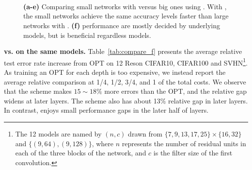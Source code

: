 \begin{figure*}[ht!]
    \centering
    
    ~
    
    ~
    
    ~
    
    \caption{\textbf{(a-e)} Comparing small networks with \adaloss versus big ones using \const. With \adaloss, 
    the small networks achieve the same accuracy levels faster than large networks with \const. 
    \textbf{(f)} \anns performance are mostly decided by underlying models, but \adaloss is beneficial regardless models. }
    \label{fig:adaloss_vs_const_of_double_cost}
\end{figure*}
\textbf{\adaloss vs. \const on the same models.} Table~\ref{tab:compare_f} presents the average relative test error rate increase from OPT on 12  Res\anns on CIFAR10, CIFAR100 and SVHN\footnote{The 12 models are named by $(n,c)$ drawn from $\{ 7, 9, 13, 17, 25 \} \times \{ 16, 32 \}$ and $\{(9,64), (9,128)\}$, where $n$ represents the number of residual units in each of the three blocks of the network, and $c$ is the filter size of the first convolution.}. As training an OPT for each depth is too expensive, we instead report the average relative comparison at 1/4, 1/2, 3/4, and 1 of the total \ann costs. 
We observe that the \const scheme makes $15\sim 18\%$ more errors than the OPT, and the relative gap widens at later layers.  The \linear scheme also has about 13\% relative gap in later layers. In contrast, \adaloss enjoys small performance gaps in the later half of layers. 
